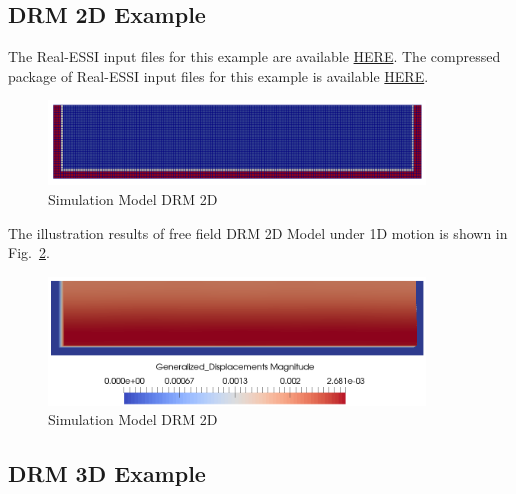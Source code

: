 \clearpage
\newpage
\subsection{DRM 2D Example}

The Real-ESSI input files for this example are available 
\href{http://cml01.engr.ucdavis.edu/shortCourse/Day1/Preprocess_examples_with_Gmsh/DRM2D}{HERE}. 
The compressed package of Real-ESSI input files for this example is available 
\href{http://cml01.engr.ucdavis.edu/shortCourse/Day1/Preprocess_examples_with_Gmsh/DRM2D/DRM2D.tgz}{HERE}. 

\begin{figure}[H]
  \centering
  \includegraphics[width = 10cm]{./Figure-files/Day1/Preprocess_examples_with_Gmsh/example3/overview.png}
  \caption{Simulation Model DRM 2D}
  \label{fig_gmsh_ex3}
\end{figure}

The illustration results of free field DRM 2D Model under 1D motion is shown 
in Fig.~\ref{fig_day1_DRM2D_results}. 

\begin{figure}[H]
  \centering
  \includegraphics[width = 10cm]{./Figure-files/Day1/Preprocess_examples_with_Gmsh/example3/DRM2D_results.png}
  \caption{Simulation Model DRM 2D}
  \label{fig_day1_DRM2D_results}
\end{figure}

\clearpage
\newpage
\subsection{DRM 3D Example}


